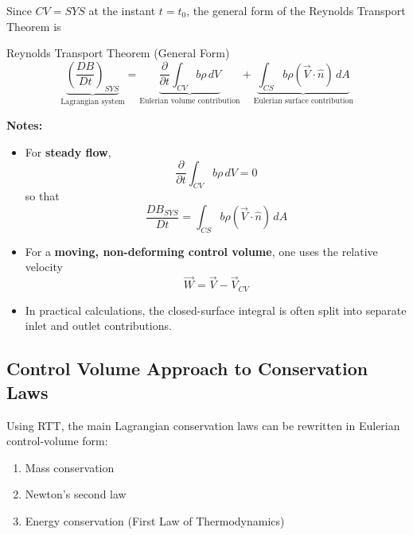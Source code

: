 Since $CV=SYS$ at the instant $t=t_0$, the general form of the Reynolds Transport Theorem is
\begin{mainbox}{Reynolds Transport Theorem (General Form)}
\begin{equation*}
    \underbrace{\left(\frac{DB}{Dt}\right)_{SYS}}_{\text{Lagrangian system}}
    =
    \underbrace{\frac{\partial}{\partial t}\int_{CV} b\rho\,dV}_{\text{Eulerian volume contribution}}
    +
    \underbrace{\int_{CS} b\rho(\vec{V}\cdot\hat{n})\,dA}_{\text{Eulerian surface contribution}}
\end{equation*}
\end{mainbox}

\textbf{Notes:}
\begin{itemize}
    \item For \textbf{steady flow},
    \begin{equation}
        \frac{\partial}{\partial t}\int_{CV} b\rho\,dV = 0
    \end{equation}
    so that
    \begin{equation}
        \frac{DB_{SYS}}{Dt}
        =
        \int_{CS} b\rho(\vec{V}\cdot\hat{n})\,dA
    \end{equation}

    \item For a \textbf{moving, non-deforming control volume}, one uses the relative velocity
    \begin{equation}
        \vec{W}=\vec{V}-\vec{V}_{CV}
    \end{equation}

    \item In practical calculations, the closed-surface integral is often split into separate inlet and outlet contributions.
\end{itemize}

\subsection{Control Volume Approach to Conservation Laws}

Using RTT, the main Lagrangian conservation laws can be rewritten in Eulerian control-volume form:
\begin{enumerate}
    \item Mass conservation
    \item Newton's second law
    \item Energy conservation (First Law of Thermodynamics)
\end{enumerate}

